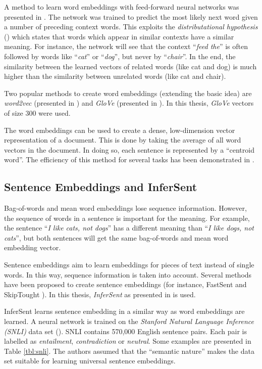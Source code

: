 A method to learn word embeddings with feed-forward neural networks was presented in \cite{bengio2003neural}. The network was trained to predict the most likely next word given a number of preceding context words. This exploits the \emph{distributational hypothesis} (\cite{harris1954distributional}) which states that words which appear in similar contexts have a similar meaning. For instance, the network will see that the context \enquote{\emph{feed the}} is often followed by words like \enquote{\emph{cat}} or \enquote{\emph{dog}}, but never by \enquote{\emph{chair}}. In the end, the similarity between the learned vectors of related words (like cat and dog) is much higher than the similarity between unrelated words (like cat and chair).

Two popular methods to create word embeddings (extending the basic idea) are \emph{word2vec} (presented in \cite{NIPS2013_5021}) and \emph{GloVe} (presented in \cite{pennington2014glove}). In this thesis, \emph{GloVe} vectors of size 300 were used.

The word embeddings can be used to create a dense, low-dimension vector representation of a document. This is done by taking the average of all word vectors in the document. In doing so, each sentence is represented by a \enquote{centroid word}. The efficiency of this method for several tasks has been demonstrated in \cite{Wieting:2015aa}.

\subsection{Sentence Embeddings and InferSent}
Bag-of-words and mean word embeddings lose sequence information. However, the sequence of words in a sentence is important for the meaning. For example, the sentence \enquote{\emph{I like cats, not dogs}} has a different meaning than \enquote{\emph{I like dogs, not cats}}, but both sentences will get the same bag-of-words and mean word embedding vector.

Sentence embeddings aim to learn embeddings for pieces of text instead of single words. In this way, sequence information is taken into account. Several methods have been proposed to create sentence embeddings (for instance, FastSent \cite{hill2016learning} and SkipTought \cite{NIPS2015_5950}). In this thesis, \emph{InferSent} as presented in \cite{Conneau:2017aa} is used.


InferSent learns sentence embedding in a similar way as word embeddings are learned. A neural network is trained on the \emph{Stanford Natural Language Inference (SNLI)} data set (\cite{snli:emnlp2015}). SNLI contains 570,000 English sentence pairs. Each pair is labelled as \emph{entailment}, \emph{contradiction} or \emph{neutral}. Some examples are presented in Table \ref{tbl:snli}. The authors assumed that the \enquote{semantic nature} %
makes the data set suitable for learning universal sentence embeddings.

